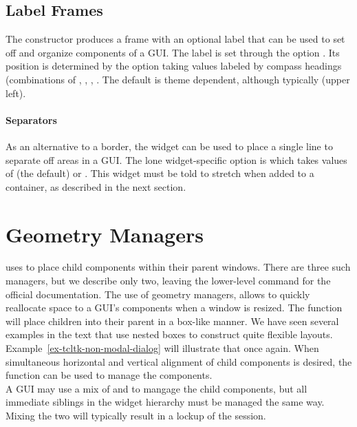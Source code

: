 \subsection{Label Frames}
\label{sec:tcltk:label-frames}

The  constructor produces a frame with an
optional label that can be used to set off and organize components of
a GUI. The label is set through the option
. Its position is determined by the option
 taking values labeled by compass
headings (combinations of , , , . The
default is theme dependent, although typically  (upper
left).

\paragraph{Separators}
As an alternative to a border, the  widget can be used
to place a single line to separate off areas in a GUI. The lone
widget-specific option is  which takes
values of  (the default) or . This
widget must be told to stretch when added to a container, as described
in the next section.

\section{Geometry Managers}
\label{sec:tcltk:geometry-managers}

\TCL\/ uses  to place child
components within their parent windows. There are three such managers,
but we describe only two, leaving the lower-level  command
for the official documentation. The use of geometry managers, allows
\TK\/ to quickly reallocate space to a GUI's components when a window is
resized.  The  function will place children into
their parent in a box-like manner. We have seen several examples in
the text that use nested boxes to construct quite flexible layouts.
Example~\ref{ex-tcltk-non-modal-dialog} will illustrate that once
again. When simultaneous horizontal and vertical alignment of child
components is desired, the  function can be used to
manage the components.
\\

A GUI may use a mix of  and  to mangage the child components,
but all immediate siblings in the widget hierarchy must be managed the same
way. Mixing the two will typically result in a lockup of the \R\/
session.


